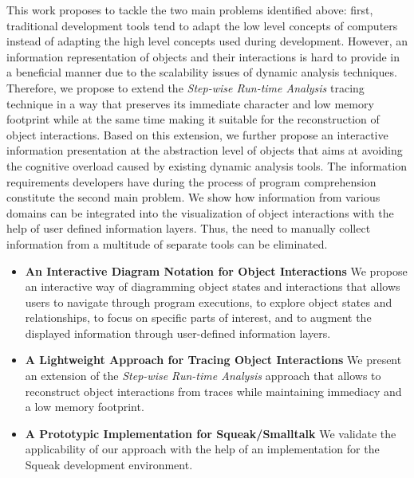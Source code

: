 This work proposes to tackle the two main problems identified above: first, traditional development tools tend to adapt the low level concepts of computers instead of adapting the high level concepts used during development.
However, an information representation of objects and their interactions is hard to provide in a beneficial manner due to the scalability issues of dynamic analysis techniques.
Therefore, we propose to extend the \emph{Step-wise Run-time Analysis} tracing technique in a way that preserves its immediate character and low memory footprint while at the same time making it suitable for the reconstruction of object interactions.
Based on this extension, we further propose an interactive information presentation at the abstraction level of objects that aims at avoiding the cognitive overload caused by existing dynamic analysis tools.
The information requirements developers have during the process of program comprehension constitute the second main problem.
We show how information from various domains can be integrated into the visualization of object interactions with the help of user defined information layers.
Thus, the need to manually collect information from a multitude of separate tools can be eliminated.


\begin{itemize}
\renewcommand{\labelitemiv}{$\ast$}

\item \textbf{An Interactive Diagram Notation for Object Interactions} We propose an interactive way of diagramming object states and interactions that allows users to navigate through program executions, to explore object states and relationships, to focus on specific parts of interest, and to augment the displayed information through user-defined information layers.

\item \textbf{A Lightweight Approach for Tracing Object Interactions} We present an extension of the \emph{Step-wise Run-time Analysis} approach that allows to reconstruct object interactions from traces while maintaining immediacy and a low memory footprint.

\item \textbf{A Prototypic Implementation for Squeak/Smalltalk} We validate the applicability of our approach with the help of an implementation for the Squeak development environment.
\end{itemize}

